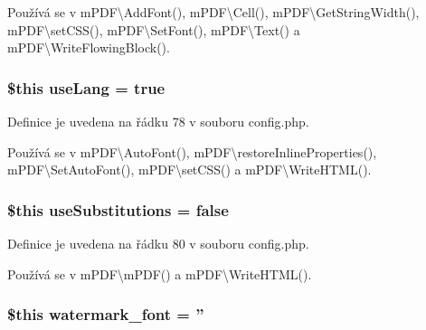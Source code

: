 Používá se v m\-P\-D\-F\textbackslash{}\-Add\-Font(), m\-P\-D\-F\textbackslash{}\-Cell(), m\-P\-D\-F\textbackslash{}\-Get\-String\-Width(), m\-P\-D\-F\textbackslash{}set\-C\-S\-S(), m\-P\-D\-F\textbackslash{}\-Set\-Font(), m\-P\-D\-F\textbackslash{}\-Text() a m\-P\-D\-F\textbackslash{}\-Write\-Flowing\-Block().

\hypertarget{config_8php_aac01eebb872feca7e3ecd9e9c043d73e}{
\subsubsection[{use\-Lang}]{\setlength{\rightskip}{0pt plus 5cm}\$this use\-Lang = true}}\label{config_8php_aac01eebb872feca7e3ecd9e9c043d73e}


Definice je uvedena na řádku 78 v souboru config.\-php.



Používá se v m\-P\-D\-F\textbackslash{}\-Auto\-Font(), m\-P\-D\-F\textbackslash{}restore\-Inline\-Properties(), m\-P\-D\-F\textbackslash{}\-Set\-Auto\-Font(), m\-P\-D\-F\textbackslash{}set\-C\-S\-S() a m\-P\-D\-F\textbackslash{}\-Write\-H\-T\-M\-L().

\hypertarget{config_8php_ab6d71e6e0c904739db868eada5928c81}{
\subsubsection[{use\-Substitutions}]{\setlength{\rightskip}{0pt plus 5cm}\$this use\-Substitutions = {\bf false}}}\label{config_8php_ab6d71e6e0c904739db868eada5928c81}


Definice je uvedena na řádku 80 v souboru config.\-php.



Používá se v m\-P\-D\-F\textbackslash{}m\-P\-D\-F() a m\-P\-D\-F\textbackslash{}\-Write\-H\-T\-M\-L().

\hypertarget{config_8php_a637c5994b2640277dd0dd20741214498}{
\subsubsection[{watermark\-\_\-font}]{\setlength{\rightskip}{0pt plus 5cm}\$this watermark\-\_\-font = ''}}\label{config_8php_a637c5994b2640277dd0dd20741214498}


